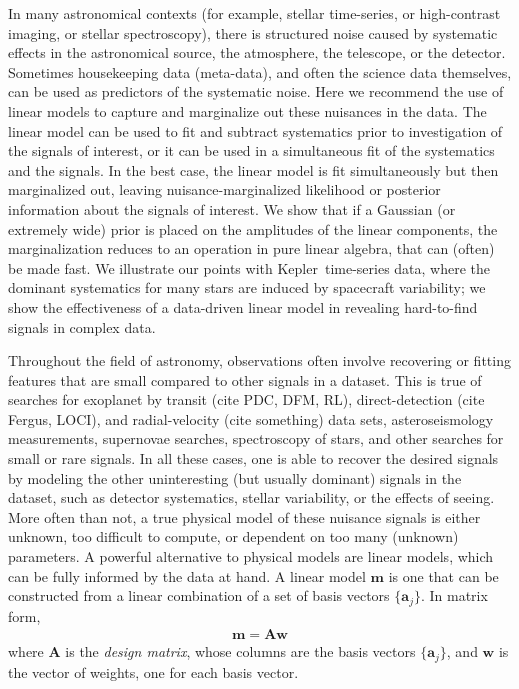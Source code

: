 \documentclass[modern]{rnaastex}
\newcommand{\project}[1]{\textsf{#1}}
\newcommand{\kepler}{\project{Kepler}}
\newcommand{\eqlabel}[1]{\label{eq:#1}}
\newcommand{\bvec}[1]{{\ensuremath{\boldsymbol{#1}}}}
\newcommand{\mA}{\ensuremath{\bvec{A}}}
\newcommand{\vw}{\ensuremath{\bvec{w}}}
\begin{document}
In many astronomical contexts (for example, stellar time-series, or
high-contrast imaging, or stellar spectroscopy), there is structured
noise caused by systematic
effects in the astronomical source, the atmosphere, the telescope, or
the detector.
Sometimes housekeeping data (meta-data), and often the science data themselves,
can be used as predictors of the systematic noise.
Here we recommend the use of linear models to capture and marginalize
out these nuisances in the data.
The linear model can be used to fit and subtract systematics prior to
investigation of the signals of interest, or it
can be used in a simultaneous fit of the systematics and the signals.
In the best case, the linear model is fit simultaneously but then marginalized
out, leaving nuisance-marginalized likelihood or posterior information
about the signals of interest.
We show that if a Gaussian (or extremely wide) prior is placed on the
amplitudes of the linear components, the marginalization reduces to an
operation in pure linear algebra, that can (often) be made fast.
We illustrate our points with \kepler\ time-series data, where the dominant
systematics for many stars are induced by spacecraft variability;
we show the effectiveness of a data-driven linear model in revealing
hard-to-find signals in complex data.

Throughout the field of astronomy, observations often involve recovering or
fitting features that are small compared to other signals in a dataset.
This is true of searches for exoplanet by transit (cite PDC, DFM, RL),
direct-detection (cite Fergus, LOCI), and radial-velocity  (cite something)
data sets, asteroseismology measurements, supernovae searches, spectroscopy
of stars, and other searches for small or rare signals. In all these cases,
one is able to recover the desired signals by modeling the other uninteresting
(but usually dominant) signals in the dataset, such as detector systematics,
stellar variability, or the effects of seeing.
More often than not, a true physical model of these nuisance signals is either
unknown, too difficult to compute, or dependent on too many (unknown)
parameters. A powerful alternative to physical models are linear models, which
can be fully informed by the data at hand. A linear model $\bvec{m}$ is one
that can be constructed from a linear combination of a set of basis vectors
$\{\bvec{a}_j\}$. In matrix form,
%
\begin{align}
\eqlabel{linearmodel}
\bvec{m} = \mA \vw
\end{align}
%
where $\mA$ is the \emph{design matrix}, whose columns are the basis
vectors $\{\bvec{a}_j\}$, and $\vw$ is the vector of weights, one
for each basis vector.
\end{document}
